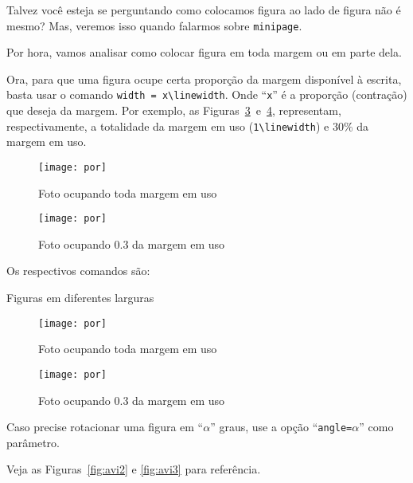 Talvez você esteja se perguntando como colocamos figura ao lado de figura não é 
mesmo?
Mas, veremos isso quando falarmos sobre \texttt{minipage}.

Por hora, vamos analisar como colocar figura em toda margem ou em parte dela.

Ora, para que uma figura ocupe certa proporção da margem disponível à escrita, 
basta usar o comando \verb|width = x\linewidth|.
Onde ``\Verb|x|'' é a proporção (contração) que deseja da margem.\mn{
  Note que $x\in\left(0, 1\right]$.
}
Por exemplo, as Figuras~\ref{fig:amargosa1}~e~\ref{fig:amargosa2}, representam, 
respectivamente, a totalidade da margem em uso (\verb|1\linewidth|) e $30\%$ da 
margem em uso.

\begin{figure}[!htbp] 
\centering 
\texttt{[image: por]} 
\caption{Foto ocupando toda margem em uso}
\label{fig:amargosa1}
\end{figure}

\begin{figure}[!htbp] 
\centering 
\texttt{[image: por]}
\caption{Foto ocupando 0.3 da margem em uso}
\label{fig:amargosa2}
\end{figure}

\newpage 

Os respectivos comandos são:

\begin{codigo}{Figuras em diferentes larguras}{\lapis}
\begin{figure}[!htbp] 
  \centering 
  \texttt{[image: por]} 
  \caption{Foto ocupando toda margem em uso}
  \label{fig:amargosa1}
\end{figure}

\begin{figure}[!htbp] 
  \centering 
  \texttt{[image: por]}
  \caption{Foto ocupando 0.3 da margem em uso}
  \label{fig:amargosa2}
\end{figure}
\end{codigo}

Caso precise rotacionar uma figura em ``$\alpha$'' graus, use a opção 
``\texttt{angle=$\alpha$}'' como parâmetro.

Veja as Figuras~\ref{fig:avi2} e \ref{fig:avi3} para referência.

